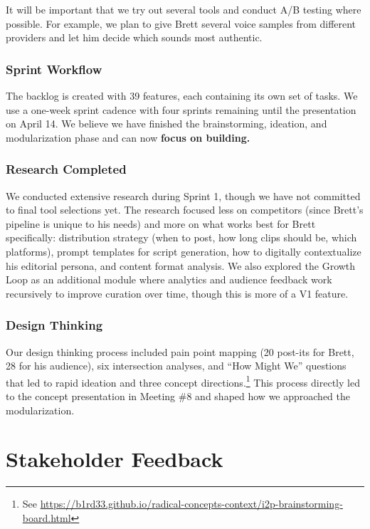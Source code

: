 \documentclass[11pt,a4paper]{article}
\begin{document}
It will be important that we try out several tools and conduct A/B testing where possible. For example, we plan to give Brett several voice samples from different providers and let him decide which sounds most authentic.

\subsubsection{Sprint Workflow}

The backlog is created with 39 features, each containing its own set of tasks. We use a one-week sprint cadence with four sprints remaining until the presentation on April 14. We believe we have finished the brainstorming, ideation, and modularization phase and can now \textbf{focus on building.}

\subsubsection{Research Completed}

We conducted extensive research during Sprint 1, though we have not committed to final tool selections yet. The research focused less on competitors (since Brett's pipeline is unique to his needs) and more on what works best for Brett specifically: distribution strategy (when to post, how long clips should be, which platforms), prompt templates for script generation, how to digitally contextualize his editorial persona, and content format analysis. We also explored the Growth Loop as an additional module where analytics and audience feedback work recursively to improve curation over time, though this is more of a V1 feature.

\subsubsection{Design Thinking}

Our design thinking process included pain point mapping (20 post-its for Brett, 28 for his audience), six intersection analyses, and ``How Might We'' questions that led to rapid ideation and three concept directions.\footnote{See \url{https://b1rd33.github.io/radical-concepts-context/i2p-brainstorming-board.html}} This process directly led to the concept presentation in Meeting \#8 and shaped how we approached the modularization.

\section{Stakeholder Feedback}
\end{document}

